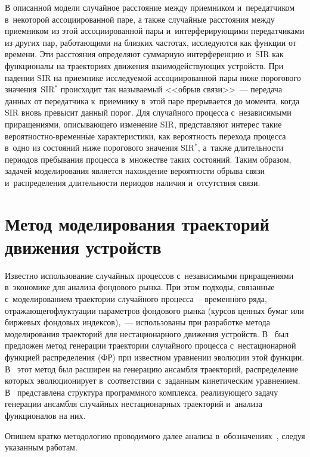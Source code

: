 \begin{multicols}{2}
  В описанной модели случайное расстояние между приемником 
и~передатчиком в~некоторой ассоциированной паре, а также случайные 
расстояния между приемником из этой ассоциированной пары 
и~интерферирующими передатчиками из других пар, работающими на близких 
частотах, исследуются как функции от времени. Эти расстояния определяют 
суммарную интерференцию и~SIR как функционалы на 
траекториях движения взаимодействующих устройств. При падении  
SIR на приемнике исследуемой ассоциированной пары ниже порогового 
значения~SIR$^*$ происходит так называемый <<обрыв связи>>~--- передача 
данных от передатчика к~приемнику в~этой паре прерывается до момента, когда 
 SIR вновь превысит данный порог. Для случайного процесса 
с~независимыми приращениями, описывающего изменение SIR, 
представляют интерес такие  
ве\-ро\-ят\-ност\-но-вре\-мен\-н$\acute{\mbox{ы}}$е характеристики, как 
вероятность перехода процесса в~одно из состояний ниже порогового значения 
SIR$^*$, а~также длительности периодов пребывания процесса в~множестве 
таких состояний. Таким образом, задачей моделирования является нахождение 
вероятности обрыва связи и~распределения длительности периодов наличия 
и~отсутствия связи.

\section{Метод моделирования траекторий движения устройств}

  Известно использование случайных процессов с~независимыми 
приращениями в~экономике для анализа фондового рынка. При этом подходы,\linebreak 
связанные с~моделированием траектории случайного процесса~-- 
временн$\acute{\mbox{о}}$го ряда, отражающего\linebreak флуктуации параметров 
фондового рынка (курсов ценных бумаг или биржевых фондовых  
индексов),~--- использованы при разработке метода моделирования траекторий 
для нестационарного движения устройств. В~\cite{15-g1} был предложен метод 
генерации траектории случайного процесса с~нестационарной функцией 
распределения (ФР) при известном уравнении эволюции этой функции.  
В~\cite{16-g1} этот метод был расширен на генерацию ансамбля траекторий, 
распределение которых эволюционирует в~соответствии с~заданным 
кинетическим уравнением. В~\cite{17-g1} представлена структура 
программного комплекса, реализующего задачу генерации ансамбля случайных 
нестационарных траекторий и~анализа функционалов на них. 

Опишем кратко 
методологию проводимого далее анализа в~обозначениях~\cite{14-g1}, следуя 
указанным работам.
  

\end{multicols}
